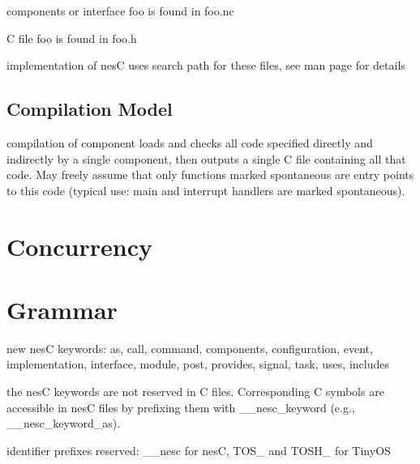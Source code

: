 \documentclass[11pt]{article}
\begin{document}
components or interface foo is found in foo.nc

C file foo is found in foo.h

implementation of nesC uses search path for these files, see man page for
details

\subsection{Compilation Model}

compilation of component loads and checks all code specified directly
and indirectly by a single component, then outputs a single C file
containing all that code. May freely assume that only functions marked
spontaneous are entry points to this code (typical use: main and 
interrupt handlers are marked spontaneous).

\section{Concurrency}

\section{Grammar}

new nesC keywords: as, call, command, components, configuration, event, 
implementation, interface, module, post, provides, signal, task, uses, 
includes

the nesC keywords are not reserved in C files. Corresponding C symbols are
accessible in nesC files by prefixing them with __nesc_keyword (e.g.,
__nesc_keyword_as).

identifier prefixes reserved: __nesc for nesC, TOS_ and TOSH_ for TinyOS
\end{document}
